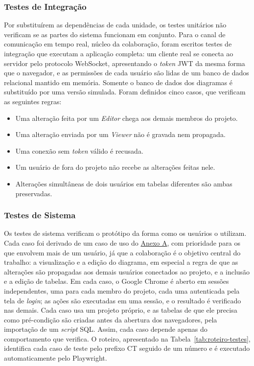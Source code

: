 \subsubsection{Testes de Integração}
Por substituírem as dependências de cada unidade, os testes unitários não verificam se as partes do sistema funcionam em conjunto. Para o canal de comunicação em tempo real, núcleo da colaboração, foram escritos testes de integração que executam a aplicação completa: um cliente real se conecta ao servidor pelo protocolo WebSocket, apresentando o \textit{token} JWT da mesma forma que o navegador, e as permissões de cada usuário são lidas de um banco de dados relacional mantido em memória. Somente o banco de dados dos diagramas é substituído por uma versão simulada. Foram definidos cinco casos, que verificam as seguintes regras:

\begin{itemize}
    \item Uma alteração feita por um \textit{Editor} chega aos demais membros do projeto.
    \item Uma alteração enviada por um \textit{Viewer} não é gravada nem propagada.
    \item Uma conexão sem \textit{token} válido é recusada.
    \item Um usuário de fora do projeto não recebe as alterações feitas nele.
    \item Alterações simultâneas de dois usuários em tabelas diferentes são ambas preservadas.
\end{itemize}

\subsubsection{Testes de Sistema}
Os testes de sistema verificam o protótipo da forma como os usuários o utilizam. Cada caso foi derivado de um caso de uso do \hyperref[anx:caso-de-uso]{Anexo A}, com prioridade para os que envolvem mais de um usuário, já que a colaboração é o objetivo central do trabalho: a visualização e a edição do diagrama, em especial a regra de que as alterações são propagadas aos demais usuários conectados ao projeto, e a inclusão e a edição de tabelas. Em cada caso, o Google Chrome é aberto em sessões independentes, uma para cada membro do projeto, cada uma autenticada pela tela de \textit{login}; as ações são executadas em uma sessão, e o resultado é verificado nas demais. Cada caso usa um projeto próprio, e as tabelas de que ele precisa como pré-condição são criadas antes da abertura dos navegadores, pela importação de um \textit{script} SQL. Assim, cada caso depende apenas do comportamento que verifica. O roteiro, apresentado na Tabela~\ref{tab:roteiro-testes}, identifica cada caso de teste pelo prefixo CT seguido de um número e é executado automaticamente pelo Playwright.

